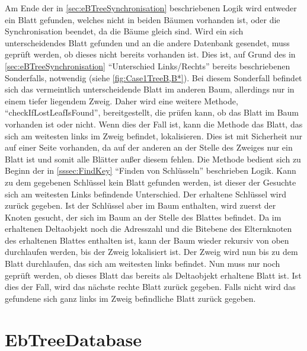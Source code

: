 \documentclass[a4paper,11pt,oneside,%
headsepline,												%
footsepline,												%
bibtotocnumbered									%
]{scrreprt}
\begin{document}
Am Ende der in \autoref{sec:eBTreeSynchronisation} beschriebenen Logik wird entweder ein Blatt gefunden, welches nicht in beiden Bäumen vorhanden ist, oder die Synchronisation beendet, da die Bäume gleich sind. Wird ein sich unterscheidendes Blatt gefunden und an die andere Datenbank gesendet, muss geprüft werden, ob dieses nicht bereits vorhanden ist. Dies ist, auf Grund des in \autoref{sec:eBTreeSynchronisation} \enquote{Unterschied Links/Rechts} bereits beschriebenen Sonderfalls, notwendig (siehe \autoref{fig:Case1TreeB,B*}). Bei diesem Sonderfall befindet sich das vermeintlich unterscheidende Blatt im anderen Baum, allerdings nur in einem tiefer liegendem Zweig. Daher wird eine weitere Methode, \enquote{checkIfLostLeafIsFound}, bereitgestellt, die prüfen kann, ob das Blatt im Baum vorhanden ist oder nicht. Wenn dies der Fall ist, kann die Methode das Blatt, das sich am weitesten links im Zweig befindet, lokalisieren. Dies ist mit Sicherheit nur auf einer Seite vorhanden, da auf der anderen an der Stelle des Zweiges nur ein Blatt ist und somit alle Blätter außer diesem fehlen. Die Methode bedient sich zu Beginn der in \autoref{sssec:FindKey} \enquote{Finden von Schlüsseln} beschrieben Logik. Kann zu dem gegebenen Schlüssel kein Blatt gefunden werden, ist dieser der Gesuchte sich am weitesten Links befindende Unterschied. Der erhaltene Schlüssel wird zurück gegeben. Ist der Schlüssel aber im Baum enthalten, wird zuerst der Knoten gesucht, der sich im Baum an der Stelle des Blattes befindet. Da im erhaltenen Deltaobjekt noch die Adresszahl und die Bitebene des Elternknoten des erhaltenen Blattes enthalten ist, kann der Baum wieder rekursiv von oben durchlaufen werden, bis der Zweig lokalisiert ist. Der Zweig wird nun bis zu dem Blatt durchlaufen, das sich am weitesten links befindet. Nun muss nur noch geprüft werden, ob dieses Blatt das bereits als Deltaobjekt erhaltene Blatt ist. Ist dies der Fall, wird das nächste rechte Blatt zurück gegeben. Falls nicht wird das gefundene sich ganz links im Zweig befindliche Blatt zurück gegeben. 

\section{EbTreeDatabase}
\end{document}

